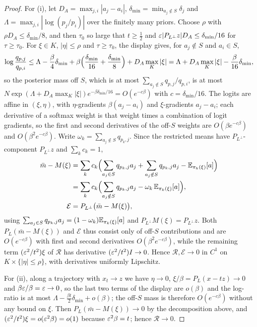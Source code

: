 \documentclass{article} %
\newcommand{\iclrbr}{\\&}\newcommand{\iclrbrq}{\\&\qquad}\newcommand{\iclrqbr}{\\&}
\newcommand{\iclrbr}{}\newcommand{\iclrbrq}{}\newcommand{\iclrqbr}{\qquad}
\theoremstyle{plain}
\theoremstyle{definition}
\theoremstyle{remark}
\begin{document}
\begin{proof}
For (i), let $D_A=\max_{j,i}|a_j-a_i|$, $\delta_{\min}=\min_{a_j\notin S}\delta_j$ and
$\Lambda=\max_{j,i}|\log(p_j/p_i)|$ over the finitely many priors. Choose $\rho$ with
$\rho D_A\le\delta_{\min}/8$, and then $\tau_0$ so large that $t\ge\tfrac12$ and
$\varepsilon|P_{L^\perp}z|D_A\le\delta_{\min}/16$ for $\tau\ge\tau_0$. For $\xi\in K$, $|\eta|\le\rho$ and
$\tau\ge\tau_0$, the display gives, for $a_j\notin S$ and $a_i\in S$,
\[
\log\frac{q_{p,j}}{q_{p,i}}
\le\Lambda-\frac{\beta}{4}\delta_{\min}+\beta\Bigl(\frac{\delta_{\min}}{16}+\frac{\delta_{\min}}{8}\Bigr)
+D_A\max_K|\xi|
=\Lambda+D_A\max_K|\xi|-\frac{\beta}{16}\delta_{\min},
\]
so the posterior mass off $S$, which is at most $\sum_{a_j\notin S}q_{p,j}/q_{p,i}$, is at most
$N\exp(\Lambda+D_A\max_K|\xi|)e^{-\beta\delta_{\min}/16}=O(e^{-c\beta})$ with $c=\delta_{\min}/16$. The logits are affine in $(\xi,\eta)$, with
$\eta$-gradients $\beta(a_j-a_i)$ and $\xi$-gradients $a_j-a_i$; each derivative of a softmax weight
is that weight times a combination of logit gradients, so the first and second derivatives of the
off-$S$ weights are $O(\beta e^{-c\beta})$ and $O(\beta^2e^{-c\beta})$. Write
$\omega_k=\sum_{a_j\notin S}q_{p_k,j}$. Since the restricted means have $P_{L^\perp}$-component
$P_{L^\perp}z$ and $\sum_kc_k=1$,
\begin{align*}
\bar m-M(\xi)
&=\sum_kc_k\Bigl(\sum_{a_j\in S}q_{p_k,j}a_j+\sum_{a_j\notin S}q_{p_k,j}a_j
-\E_{\pi_k(\xi)}[a]\Bigr)
\iclrbr=\sum_kc_k\Bigl(\sum_{a_j\notin S}q_{p_k,j}a_j-\omega_k\,\E_{\pi_k(\xi)}[a]\Bigr),\\
\mathcal E&=P_{L^\perp}\bigl(\bar m-M(\xi)\bigr),
\end{align*}
using $\sum_{a_j\in S}q_{p_k,j}a_j=(1-\omega_k)\mathbb{E}_{\pi_k(\xi)}[a]$ and $P_{L^\perp}M(\xi)=P_{L^\perp}z$.
Both $P_L(\bar m-M(\xi))$ and $\mathcal E$ thus consist only of off-$S$ contributions and are
$O(e^{-c\beta})$ with first and second derivatives $O(\beta^2e^{-c\beta})$, while the remaining term
$(\varepsilon^2/t^2)\xi$ of $\mathcal R$ has derivative $(\varepsilon^2/t^2)I\to0$. Hence $\mathcal R,\mathcal E\to0$
in $C^1$ on $K\times\{|\eta|\le\rho\}$, with derivatives uniformly Lipschitz.

For (ii), along a trajectory with $x_t\to z$ we have $\eta\to0$, $\xi/\beta=P_L(x-tz)\to0$ and
$\beta\varepsilon/\beta=\varepsilon\to0$, so the last two terms of the display are $o(\beta)$ and the log-ratio is
at most $\Lambda-\frac{\beta t}{2}\delta_{\min}+o(\beta)$; the off-$S$ mass is therefore
$O(e^{-c\beta})$ without any bound on $\xi$. Then $P_L(\bar m-M(\xi))\to0$ by the decomposition
above, and $(\varepsilon^2/t^2)\xi=o(\varepsilon^2\beta)=o(1)$ because $\varepsilon^2\beta=t$; hence $\mathcal R\to0$.
\end{proof}
\end{document}
